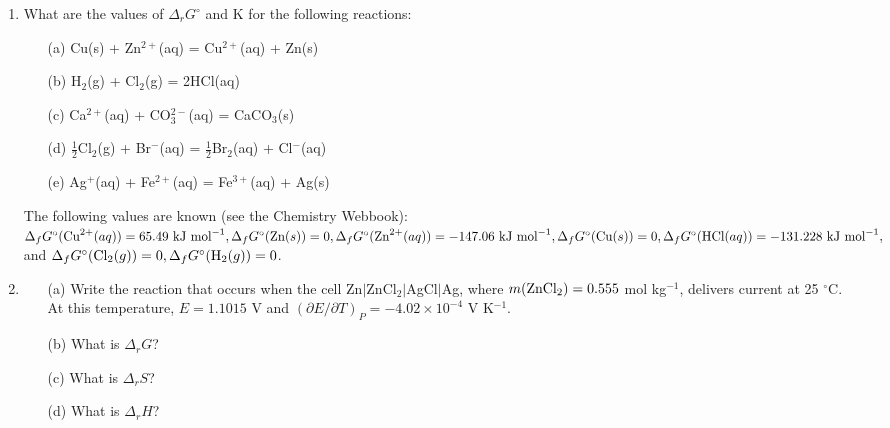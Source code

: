 \begin{enumerate}

\item What are the values of $\Delta_rG^\circ$ and K for the following reactions:
\begin{itemize}
\item[(a)] Cu(s) + Zn$^{2+}$(aq) = Cu$^{2+}$(aq) + Zn(s)
\item[(b)] H$_2$(g) + Cl$_2$(g) = 2HCl(aq)
\item[(c)] Ca$^{2+}$(aq) + CO$_3^{2-}$(aq) = CaCO$_3$(s)
\item[(d)] $\frac{1}{2}$Cl$_2$(g) + Br$^-$(aq) = $\frac{1}{2}$Br$_2$(aq) + Cl$^-$(aq)
\item[(e)] Ag$^+$(aq) + Fe$^{2+}$(aq) = Fe$^{3+}$(aq) + Ag(s)
\end{itemize}
The following values are known (see the Chemistry Webbook):\\ $\Delta_fG^\circ(\textnormal{Cu}^{2+}(aq)) = 65.49\textnormal{ kJ mol}^{-1}, \Delta_fG^\circ(\textnormal{Zn}(s)) = 0, \Delta_fG^\circ(\textnormal{Zn}^{2+}(aq)) = -147.06\textnormal{ kJ mol}^{-1}, \Delta_fG^\circ(\textnormal{Cu}(s)) = 0, \Delta_fG^\circ(\textnormal{HCl}(aq)) = -131.228\textnormal{ kJ mol}^{-1},$ and $\Delta_fG^\circ(\textnormal{Cl}_2(g)) = 0, \Delta_fG^\circ(\textnormal{H}_2(g)) = 0$.\\


\item
\begin{itemize}
\item[(a)] Write the reaction that occurs when the cell Zn$\vert$ZnCl$_2\vert$AgCl$\vert$Ag, where $m(\textnormal{ZnCl}_2) = 0.555$ mol kg$^{-1}$, delivers current at 25 $^\circ$C. At this temperature, $E = 1.1015$ V and $\left(\partial E/\partial T\right)_P = -4.02\times 10^{-4}$ V K$^{-1}$. 
\item[(b)] What is $\Delta_rG$?
\item[(c)] What is $\Delta_rS$?
\item[(d)] What is $\Delta_rH$?
\end{itemize}

\vspace*{0.2cm}



\end{enumerate}
